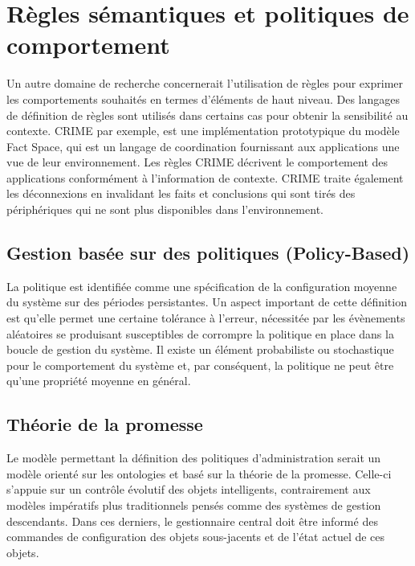 \section{Règles sémantiques et politiques de comportement}

Un autre domaine de recherche concernerait l'utilisation de règles pour exprimer
les comportements souhaités en termes d'éléments de haut niveau. Des langages
de définition de règles sont utilisés dans certains cas pour obtenir la
sensibilité au contexte. CRIME \cite{murphy_coordination_2007} par exemple, est
une implémentation prototypique du modèle Fact Space, qui est un langage de
coordination fournissant aux applications une vue de leur environnement. Les
règles CRIME décrivent le comportement des applications conformément à
l'information de contexte. CRIME traite également les déconnexions en invalidant
les faits et conclusions qui sont tirés des périphériques qui ne sont plus
disponibles dans l'environnement.

\subsection{Gestion basée sur des politiques (Policy-Based)}

La politique est identifiée comme une spécification de la configuration moyenne
du système sur des périodes persistantes. Un aspect important de cette
définition est qu'elle permet une certaine tolérance à l'erreur, nécessitée par
les évènements aléatoires se produisant susceptibles de corrompre la politique
en place dans la boucle de gestion du système. Il existe un élément probabiliste
ou stochastique pour le comportement du système et, par conséquent, la politique
ne peut être qu'une propriété moyenne en général.

\subsection{Théorie de la promesse}

Le modèle permettant la définition des politiques d'administration serait un
modèle orienté sur les ontologies et basé sur la théorie de la promesse.
Celle-ci s'appuie sur un contrôle évolutif des objets intelligents,
contrairement aux modèles impératifs plus traditionnels pensés comme des
systèmes de gestion descendants. Dans ces derniers, le gestionnaire central
doit être informé des commandes de configuration des objets sous-jacents et de
l'état actuel de ces objets.

